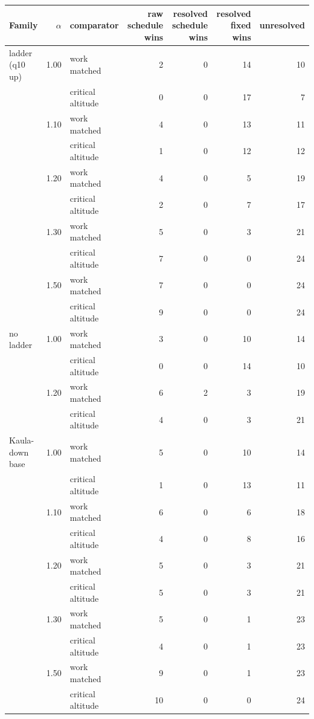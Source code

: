 \begin{tabular}{@{}l r l r r r r@{}}
\toprule
Family & $\alpha$ & comparator & raw schedule wins & resolved schedule wins & resolved fixed wins & unresolved \\
\midrule
ladder (q10 up) & 1.00 & work matched & 2 & 0 & 14 & 10 \\
 &  & critical altitude & 0 & 0 & 17 & 7 \\
 & 1.10 & work matched & 4 & 0 & 13 & 11 \\
 &  & critical altitude & 1 & 0 & 12 & 12 \\
 & 1.20 & work matched & 4 & 0 & 5 & 19 \\
 &  & critical altitude & 2 & 0 & 7 & 17 \\
 & 1.30 & work matched & 5 & 0 & 3 & 21 \\
 &  & critical altitude & 7 & 0 & 0 & 24 \\
 & 1.50 & work matched & 7 & 0 & 0 & 24 \\
 &  & critical altitude & 9 & 0 & 0 & 24 \\
\midrule
no ladder & 1.00 & work matched & 3 & 0 & 10 & 14 \\
 &  & critical altitude & 0 & 0 & 14 & 10 \\
 & 1.20 & work matched & 6 & 2 & 3 & 19 \\
 &  & critical altitude & 4 & 0 & 3 & 21 \\
\midrule
Kaula-down base & 1.00 & work matched & 5 & 0 & 10 & 14 \\
 &  & critical altitude & 1 & 0 & 13 & 11 \\
 & 1.10 & work matched & 6 & 0 & 6 & 18 \\
 &  & critical altitude & 4 & 0 & 8 & 16 \\
 & 1.20 & work matched & 5 & 0 & 3 & 21 \\
 &  & critical altitude & 5 & 0 & 3 & 21 \\
 & 1.30 & work matched & 5 & 0 & 1 & 23 \\
 &  & critical altitude & 4 & 0 & 1 & 23 \\
 & 1.50 & work matched & 9 & 0 & 1 & 23 \\
 &  & critical altitude & 10 & 0 & 0 & 24 \\
\bottomrule
\end{tabular}